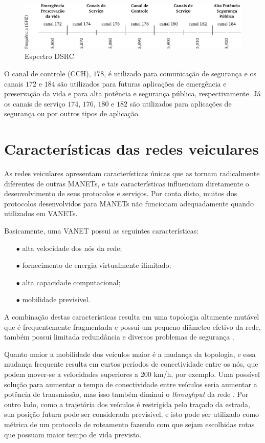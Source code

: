 \begin{figure}[htbp]
\centering
 \includegraphics[width=.95\textwidth]{chapters/fig/dsrc.pdf}
\caption{Espectro DSRC}
\label{fig:dsrc}
\end{figure}

O canal de controle (CCH), $178$, é utilizado para comunicação de segurança e
os canais $172$ e $184$ são utilizados para futuras aplicações de emergência e
preservação da vida e para alta potência e segurança pública, respectivamente.
Já os canais de serviço $174$, $176$, $180$ e $182$ são utilizados para
aplicações de segurança ou por outros tipos de aplicação.


\section{Características das redes veiculares}

As redes veiculares apresentam características únicas que as tornam
radicalmente diferentes \cite{blum2004challenges} de outras MANETs, e  
tais características influenciam diretamente o desenvolvimento de 
seus protocolos e serviços. Por conta disto, muitos dos protocolos 
desenvolvidos para MANETs não funcionam adequadamente quando utilizados 
em VANETs. 

Basicamente, uma VANET possui as seguintes características:
\begin{enumerate}
  \item[$\bullet$] alta velocidade dos nós da rede;
  \item[$\bullet$] fornecimento de energia virtualmente ilimitado;
  \item[$\bullet$] alta capacidade computacional;
  \item[$\bullet$] mobilidade previsível.
\end{enumerate}

A combinação destas características resulta em uma topologia altamente 
mutável que é frequentemente fragmentada e possui um pequeno diâmetro 
efetivo da rede, também possui limitada redundância e diversos problemas 
de segurança \cite{raya2006securing, dotzer2006privacy, golle2004detecting}.

Quanto maior a mobilidade dos veículos maior é a mudança da topologia, 
e essa mudança frequente resulta em curtos períodos de conectividade
entre os nós, que podem mover-se a velocidades superiores a 200 km/h, 
por exemplo. Uma possível solução para aumentar o tempo de conectividade 
entre veículos seria aumentar a potência de transmissão, mas isso também 
diminui o \textit{throughput} da rede \cite{khorashadi2007impact,chen2007impact}. 
Por outro lado, como a trajetória dos veículos é restrigida pelo traçado 
da estrada, sua posição futura pode ser considerada previsível, e isto pode
ser utilizado como métrica de um protocolo de roteamento fazendo com que
sejam escolhidas rotas que possuam maior tempo de vida previsto.

